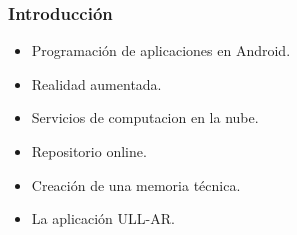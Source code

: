 \begin{frame}
	\frametitle{Introducción}
		\begin{itemize}
			\item Programación de aplicaciones en Android.
			\item Realidad aumentada.
			\item Servicios de computacion en la nube. 
			\item Repositorio online.
			\item Creación de una memoria técnica.
			\item La aplicación ULL-AR. 
		\end{itemize}
	\endblock{}	
\end{frame}  
